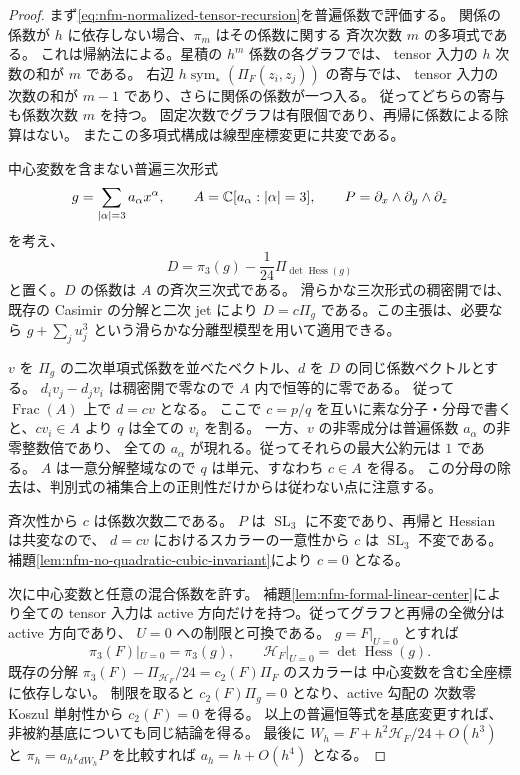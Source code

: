 \begin{proof}
まず\eqref{eq:nfm-normalized-tensor-recursion}を普遍係数で評価する。
関係の係数が $h$ に依存しない場合、$\pi_m$ はその係数に関する
斉次次数 $m$ の多項式である。
これは帰納法による。星積の $h^m$ 係数の各グラフでは、
tensor 入力の $h$ 次数の和が $m$ である。
右辺 $h\operatorname{sym}_*(\Pi_F(z_i,z_j))$ の寄与では、
tensor 入力の次数の和が $m-1$ であり、さらに関係の係数が一つ入る。
従ってどちらの寄与も係数次数 $m$ を持つ。
固定次数でグラフは有限個であり、再帰に係数による除算はない。
またこの多項式構成は線型座標変更に共変である。

中心変数を含まない普遍三次形式
\[
 g=\sum_{|\alpha|=3}a_\alpha x^\alpha,
 \qquad A=\mathbb C[a_\alpha:|\alpha|=3],
 \qquad P=\partial_x\wedge\partial_y\wedge\partial_z
\]
を考え、
\[
 D=\pi_3(g)-\frac1{24}\Pi_{\det\operatorname{Hess}(g)}
\]
と置く。$D$ の係数は $A$ の斉次三次式である。
滑らかな三次形式の稠密開では、既存の Casimir の分解と二次 jet により
$D=c\Pi_g$ である。この主張は、必要なら
$g+\sum_j u_j^3$ という滑らかな分離型模型を用いて適用できる。

$v$ を $\Pi_g$ の二次単項式係数を並べたベクトル、$d$ を
$D$ の同じ係数ベクトルとする。
$d_i v_j-d_j v_i$ は稠密開で零なので $A$ 内で恒等的に零である。
従って $\operatorname{Frac}(A)$ 上で $d=cv$ となる。
ここで $c=p/q$ を互いに素な分子・分母で書くと、$cv_i\in A$ より
$q$ は全ての $v_i$ を割る。
一方、$v$ の非零成分は普遍係数 $a_\alpha$ の非零整数倍であり、
全ての $a_\alpha$ が現れる。従ってそれらの最大公約元は $1$ である。
$A$ は一意分解整域なので $q$ は単元、すなわち $c\in A$ を得る。
この分母の除去は、判別式の補集合上の正則性だけからは従わない点に注意する。

斉次性から $c$ は係数次数二である。
$P$ は $\operatorname{SL}_3$ に不変であり、再帰と Hessian は共変なので、
$d=cv$ におけるスカラーの一意性から $c$ は
$\operatorname{SL}_3$ 不変である。
補題\ref{lem:nfm-no-quadratic-cubic-invariant}により $c=0$ となる。

次に中心変数と任意の混合係数を許す。
補題\ref{lem:nfm-formal-linear-center}により全ての tensor 入力は
active 方向だけを持つ。従ってグラフと再帰の全微分は active 方向であり、
$U=0$ への制限と可換である。
$g=F|_{U=0}$ とすれば
\[
 \pi_3(F)|_{U=0}=\pi_3(g),\qquad
 \mathscr H_F|_{U=0}=\det\operatorname{Hess}(g).
\]
既存の分解
$\pi_3(F)-\Pi_{\mathscr H_F}/24=c_2(F)\Pi_F$ のスカラーは
中心変数を含む全座標に依存しない。
制限を取ると $c_2(F)\Pi_g=0$ となり、active 勾配の
次数零 Koszul 単射性から $c_2(F)=0$ を得る。
以上の普遍恒等式を基底変更すれば、非被約基底についても同じ結論を得る。
最後に $W_h=F+h^2\mathscr H_F/24+O(h^3)$ と
$\pi_h=a_h\iota_{dW_h}P$ を比較すれば $a_h=h+O(h^4)$ となる。
\end{proof}

